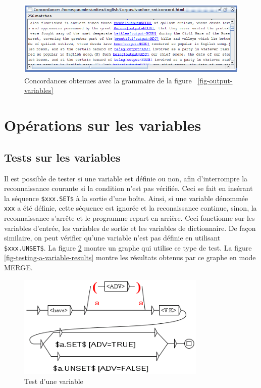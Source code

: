 \begin{figure}[!ht]
\begin{center}
\includegraphics[width=15cm]{resources/img/fig6-17s.png}
\caption{Concordances obtenues avec la grammaire de la figure ~\ref{fig-output-variables}\label{fig-output-variables-concord}}
\end{center}
\end{figure}


\section{Opérations sur les variables}
\label{section-ops-on-variables}
\subsection{Tests sur les variables}

\noindent Il est possible de tester si une variable est définie ou non, afin d'interrompre la
reconnaissance courante si la condition n'est pas vérifiée. Ceci se fait en insérant la  séquence
\verb+$xxx.SET$+ à la sortie d'une boîte. Ainsi, si une variable dénommée \verb+xxx+ a été définie,
cette séquence est ignorée et la reconaissance continue, sinon, la reconnaissance s'arrête
et le programme repart en arrière. Ceci fonctionne sur les variables d'entrée, les variables de
sortie et les variables de dictionnaire. De façon similaire, on peut vérifier qu'une variable n'est
pas définie en utilisant \verb+$xxx.UNSET$+. La figure \ref{fig-testing-a-variable} montre un graphe
qui utilise ce type de test. La figure \ref{fig-testing-a-variable-results} montre les résultats obtenus par ce graphe en mode MERGE.

\begin{figure}[!ht]
\begin{center}
\includegraphics[width=9cm]{resources/img/fig6-29b.png}
\caption{Test d'une variable\label{fig-testing-a-variable}}
\end{center}
\end{figure}

